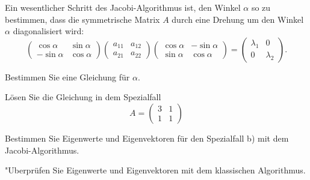 Ein wesentlicher Schritt des Jacobi-Algorithmus ist, den Winkel
$\alpha$ so zu bestimmen, dass die symmetrische Matrix $A$ durch eine Drehung
um den Winkel $\alpha$ diagonalisiert wird:
\[
\begin{pmatrix}
 \cos\alpha&\sin\alpha\\
-\sin\alpha&\cos\alpha
\end{pmatrix}
\begin{pmatrix}
a_{11}&a_{12}\\
a_{21}&a_{22}
\end{pmatrix}
\begin{pmatrix}
 \cos\alpha&-\sin\alpha\\
 \sin\alpha& \cos\alpha
\end{pmatrix}
=
\begin{pmatrix}
\lambda_1&0\\
0&\lambda_2
\end{pmatrix}.
\]
\begin{teilaufgaben}
\item Bestimmen Sie eine Gleichung für $\alpha$.
\item Lösen Sie die Gleichung in dem Spezialfall
\[
A=\begin{pmatrix}
3&1\\
1&1
\end{pmatrix}
\]
\item Bestimmen Sie Eigenwerte und Eigenvektoren für den
Spezialfall b) mit dem Jacobi-Algorithmus.
\item "Uberprüfen Sie Eigenwerte und Eigenvektoren mit dem klassischen
Algorithmus.
\end{teilaufgaben}


